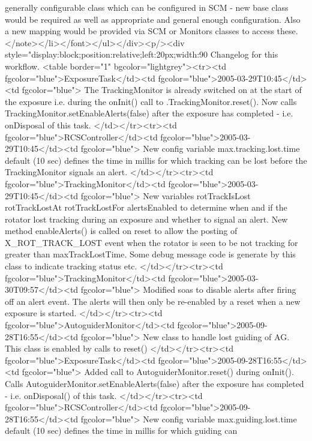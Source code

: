 	generally configurable class which can be configured in SCM - new base class would be required
	as well as appropriate and general enough configuration. Also a new mapping would be provided
	via SCM or Monitors classes to access these.
      </note></li></font></ul></div><p/><div style="display:block;position:relative;left:20px;width:90%
      Changelog for this workflow.
      <table border="1" bgcolor="lightgrey"><tr><td fgcolor="blue">ExposureTask</td><td fgcolor="blue">2005-03-29T10:45</td><td fgcolor="blue"> 
	  The TrackingMonitor is already switched on at the start of the exposure i.e. during the onInit() call
	  to .TrackingMonitor.reset().
	  Now calls TrackingMonitor.setEnableAlerts(false) after the exposure has completed - i.e. onDisposal
	  of this task.
	</td></tr><tr><td fgcolor="blue">RCSController</td><td fgcolor="blue">2005-03-29T10:45</td><td fgcolor="blue"> 
	  New config variable max.tracking.lost.time default (10 sec) defines the time in millis for which tracking can 
	  be lost before the TrackingMonitor signals an alert. 
	</td></tr><tr><td fgcolor="blue">TrackingMonitor</td><td fgcolor="blue">2005-03-29T10:45</td><td fgcolor="blue"> 
	  New variables rotTrackIsLost rotTrackLostAt rotTrackLostFor alertsEnabled to determine when and
	  if the rotator lost tracking during an exposure and whether to signal an alert. 
	  New method enableAlerts() is called on reset to allow the posting of X_ROT_TRACK_LOST event
	  when the rotator is seen to be not tracking for greater than maxTrackLostTime. 
	  Some debug message code is generate by this class to indicate tracking status etc.
	</td></tr><tr><td fgcolor="blue">TrackingMonitor</td><td fgcolor="blue">2005-03-30T09:57</td><td fgcolor="blue"> 
	    Modified soas to disable alerts after firing off an alert event. The alerts will then only be re-enabled
	    by a reset when a new exposure is started.
	  </td></tr><tr><td fgcolor="blue">AutoguiderMonitor</td><td fgcolor="blue">2005-09-28T16:55</td><td fgcolor="blue"> 
	    New class to handle lost guiding of AG. This class is enabled by calls to reset()
	  </td></tr><tr><td fgcolor="blue">ExposureTask</td><td fgcolor="blue">2005-09-28T16:55</td><td fgcolor="blue"> 
	    Added call to AutoguiderMonitor.reset() during onInit().
	    Calls AutoguiderMonitor.setEnableAlerts(false) after the exposure has completed - 
	    i.e. onDisposal() of this task.
	  </td></tr><tr><td fgcolor="blue">RCSController</td><td fgcolor="blue">2005-09-28T16:55</td><td fgcolor="blue"> 
	    New config variable max.guiding.lost.time default (10 sec) defines the time in millis for which guiding can 

